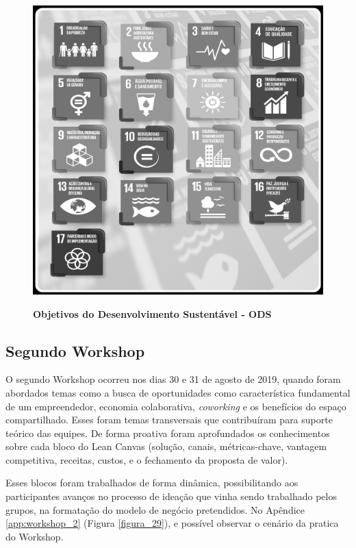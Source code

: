 \begin{figure}[H]
\centering
\caption{\textbf{Objetivos do Desenvolvimento Sustentável - ODS}}
\includegraphics[scale=0.1]{Imagens/ODS_GERAL.png}
\label{fig:ods}
\end{figure}


\subsection{Segundo Workshop}


O segundo Workshop ocorreu nos dias 30 e 31 de agosto de 2019, quando foram abordados temas como a busca de oportunidades como característica fundamental de um empreendedor, economia colaborativa, \textit{coworking} e os benefícios do espaço compartilhado. Esses foram temas transversais que contribuíram para suporte teórico das equipes. De forma proativa foram aprofundados os conhecimentos sobre cada bloco do Lean Canvas (solução, canais, métricas-chave, vantagem competitiva, receitas, custos, e o fechamento da proposta de valor). 

Esses blocos foram trabalhados de forma dinâmica, possibilitando aos participantes avanços no processo de ideação que vinha sendo trabalhado pelos grupos, na formatação do modelo de negócio pretendidos. No Apêndice \ref{app:workshop_2}  (Figura \ref{figura_29}), 
e possível observar o cenário da pratica do Workshop.
 


